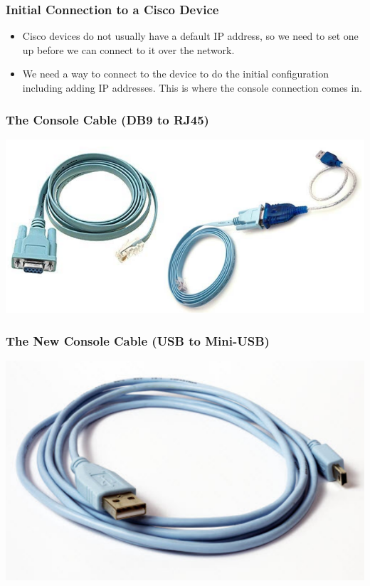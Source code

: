 \documentclass[pdflatex,compress]{beamer}
\begin{document}
\begin{frame}
	\frametitle{Initial Connection to a Cisco Device}
	\begin{itemize}
		\item Cisco devices do not usually have a default IP address, so we need to set one up before we can connect to it over the network.
		\item We need a way to connect to the device to do the initial configuration including adding IP addresses. This is where the console connection comes in.
	\end{itemize}
\end{frame}

\begin{frame}
	\frametitle{The Console Cable (DB9 to RJ45)}
	\begin{center}
		\includegraphics[width=1\linewidth]{img/img03}
	\end{center}
\end{frame}

\begin{frame}
	\frametitle{The New Console Cable (USB to Mini-USB)}
	\begin{center}
		\includegraphics[width=1\linewidth]{img/img04}
	\end{center}
\end{frame}
\end{document}
